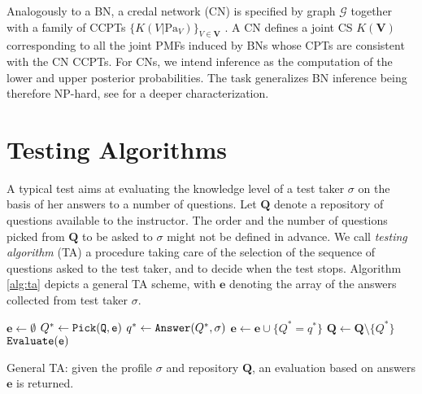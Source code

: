 \documentclass[runningheads]{llncs}
\begin{document}
Analogously to a BN, a credal network (CN) is specified by graph $\mathcal{G}$ together with a family of CCPTs $\{K(V|\mathrm{Pa}_V)\}_{V\in\bm{V}}$ \cite{cozman2000}. A CN defines a joint CS $K(\bm{V})$ corresponding to all the joint PMFs induced by BNs whose CPTs are consistent with the CN CCPTs. For CNs, we intend inference as the computation of the lower and upper posterior probabilities. The task generalizes BN inference being therefore NP-hard, see  \cite{maua2014jair} for a deeper characterization.

\section{Testing Algorithms}\label{sec:cat}
A typical test aims at evaluating the knowledge level of a test taker $\sigma$ on the basis of her answers to a number of questions. Let $\bm{Q}$ denote a repository of questions available to the instructor. The order and the number of questions picked from $\bm{Q}$ to be asked to $\sigma$ might not be defined in advance. We call \emph{testing algorithm} (TA) a procedure taking care of the selection of the sequence of questions asked to the test taker, and to decide when the test stops. Algorithm \ref{alg:ta} depicts a general TA scheme, with $\bm{e}$ denoting the array of the answers collected from test taker $\sigma$.

\begin{algorithm}[htp!]
\begin{algorithmic}[1]
\STATE $\bm{e}\gets\emptyset$
\STATE $Q^* \gets \tt{Pick}(\bm{Q},\bm{e})$
\STATE $q^* \gets {\tt{Answer}}(Q^*,\sigma)$
\STATE $\bm{e} \gets \bm{e} \cup \{ Q^*=q^* \}$
\STATE $\bm{Q} \gets \bm{Q} \setminus \{ Q^*\}$
\ENDWHILE
{} $\tt{Evaluate}(\bm{e})$
\end{algorithmic}
\caption{General TA: given the profile $\sigma$ and repository $\bm{Q}$, an evaluation based on answers $\bm{e}$ is returned.\label{alg:ta}}
\end{algorithm}
\end{document}
